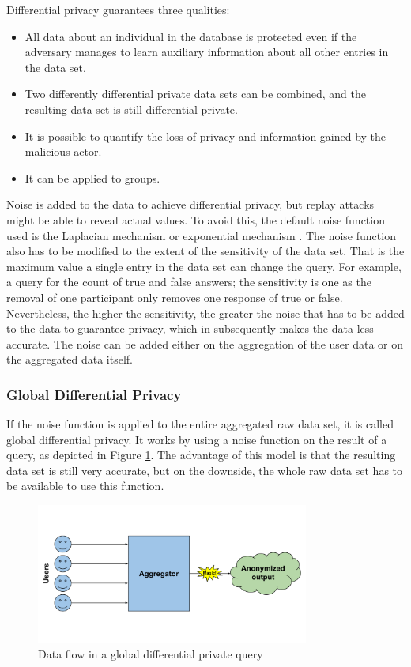 Differential privacy guarantees three qualities:
\begin{itemize}
    \item All data about an individual in the database is protected even if the adversary manages to learn auxiliary information about all other entries in the data set.
    \item Two differently differential private data sets can be combined, and the resulting data set is still differential private.
    \item It is possible to quantify the loss of privacy and information gained by the malicious actor.
    \item It can be applied to groups.
\end{itemize}

Noise is added to the data to achieve differential privacy,  but replay attacks might be able to reveal actual values. To avoid this, the default noise function used is the Laplacian mechanism or exponential mechanism \cite{DBLP:journals/fttcs/DworkR14}. The noise function also has to be modified to the extent of the sensitivity of the data set. That is the maximum value a single entry in the data set can change the query. For example, a query for the count of true and false answers; the sensitivity is one as the removal of one participant only removes one response of true or false. Nevertheless, the higher the sensitivity, the greater the noise that has to be added to the data to guarantee privacy, which in subsequently makes the data less accurate. The noise can be added either on the aggregation of the user data or on the aggregated data itself.

\subsubsection{Global Differential Privacy}
If the noise function is applied to the entire aggregated raw data set, it is called global differential privacy. It works by using a noise function on the result of a query, as depicted in Figure \ref{fig:global_diff}. The advantage of this model is that the resulting data set is still very accurate, but on the downside, the whole raw data set has to be available to use this function.

\begin{figure}[htpb]
  \centering
  \includegraphics[width=0.8\textwidth]{figures/global_diff.png}
  \caption{Data flow in a global differential private query \cite{desfontaines}}
  \label{fig:global_diff}
\end{figure}

